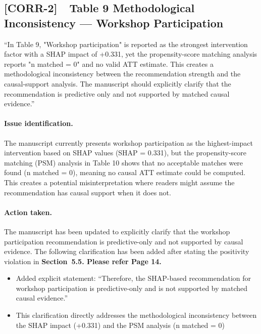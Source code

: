 \documentclass[11pt,a4paper]{article}
\newcommand{\cid}[1]{\textcolor{revred}{\textbf{[#1]}}}
\newcommand{\sectref}[1]{Section~#1}
\newcommand{\stress}[1]{\textbf{#1}}
\begin{document}
\subsection*{\cid{CORR-2}~~Table 9 Methodological Inconsistency — Workshop Participation}

\begin{reviewerquote}
``In Table 9, "Workshop participation" is reported as the strongest intervention factor with a SHAP impact of +0.331, yet the propensity-score matching analysis reports "n matched = 0" and no valid ATT estimate. This creates a methodological inconsistency between the recommendation strength and the causal-support analysis. The manuscript should explicitly clarify that the recommendation is predictive only and not supported by matched causal evidence.''
\end{reviewerquote}

\paragraph{Issue identification.} The manuscript currently presents workshop participation as the highest-impact intervention based on SHAP values (SHAP = 0.331), but the propensity-score matching (PSM) analysis in Table 10 shows that no acceptable matches were found (n matched = 0), meaning no causal ATT estimate could be computed. This creates a potential misinterpretation where readers might assume the recommendation has causal support when it does not.

\paragraph{Action taken.} The manuscript has been updated to explicitly clarify that the workshop participation recommendation is predictive-only and not supported by causal evidence. The following clarification has been added after stating the positivity violation in  \stress{\sectref{5.5}. Please refer Page 14.}

\begin{itemize}
  \item Added explicit statement: ``Therefore, the SHAP-based recommendation for workshop participation is predictive-only and is not supported by matched causal evidence.''
  \item This clarification directly addresses the methodological inconsistency between the SHAP impact (+0.331) and the PSM analysis (n matched = 0)
\end{itemize}
\end{document}

